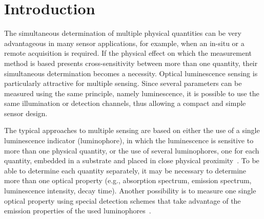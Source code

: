 \documentclass[sensors,article,accept,moreauthors,pdftex,10pt,a4paper]{Definitions/mdpi}
\theoremstyle{definition}
\begin{document}


\section{Introduction}
\label{Introduction}

The simultaneous determination of multiple physical quantities can be very advantageous in many sensor applications, for example, when an in-situ or a remote acquisition is required. 
If the physical effect on which the measurement method is based presents cross-sensitivity between more than one quantity, their simultaneous determination becomes a necessity.
Optical luminescence sensing is particularly attractive for multiple sensing. 
Since several parameters can be measured using the same principle, namely luminescence, it is possible to use the same illumination or detection channels, thus allowing a compact and simple sensor design.

The typical approaches to multiple sensing are based on either the use of a single luminescence indicator (luminophore), in which the luminescence is sensitive to more than one physical quantity, or the use of several luminophores, one for each quantity, embedded in a substrate and placed in close physical proximity~\cite{Stich2010,Borisov2011novel,Kameya2014,Wang2014,Santoro2016,Biring2019, wolfbeis1991feasibility, zieger2020tadf, ohira2009fiber}. To be able to determine each quantity separately, it may be necessary to determine more than one optical property (e.g., absorption spectrum, emission spectrum, luminescence intensity, decay time). Another possibility is to measure one single optical property using special detection schemes that take advantage of the emission properties of the used luminophores~\cite{Wang2014,Biring2019,Collier2013,Stehning2004,Jorge2008,Moore2006}. 
\end{document}

